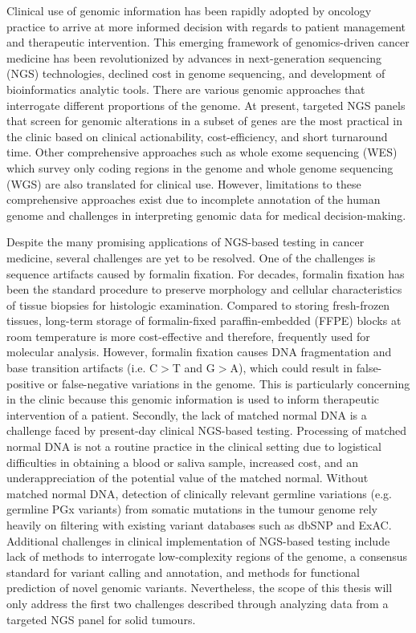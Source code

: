 Clinical use of genomic information has been rapidly adopted by oncology practice to arrive at more informed decision with regards to patient management and therapeutic intervention. This emerging framework of genomics-driven cancer medicine has been revolutionized by advances in next-generation sequencing (NGS) technologies, declined cost in genome sequencing, and development of bioinformatics analytic tools. There are various genomic approaches that interrogate different proportions of the genome. At present, targeted NGS panels that screen for genomic alterations in a subset of genes are the most practical in the clinic based on clinical actionability, cost-efficiency, and short turnaround time. Other comprehensive approaches such as whole exome sequencing (WES) which survey only coding regions in the genome and whole genome sequencing (WGS) are also translated for clinical use. However, limitations to these comprehensive approaches exist due to incomplete annotation of the human genome and challenges in interpreting genomic data for medical decision-making.

Despite the many promising applications of NGS-based testing in cancer medicine, several challenges are yet to be resolved. One of the challenges is sequence artifacts caused by formalin fixation. For decades, formalin fixation has been the standard procedure to preserve morphology and cellular characteristics of tissue biopsies for histologic examination. Compared to storing fresh-frozen tissues, long-term storage of formalin-fixed paraffin-embedded (FFPE) blocks at room temperature is more cost-effective and therefore, frequently used for molecular analysis. However, formalin fixation causes DNA fragmentation and base transition artifacts (i.e. C$>$T and G$>$A), which could result in false-positive or false-negative variations in the genome. This is particularly concerning in the clinic because this genomic information is used to inform therapeutic intervention of a patient. Secondly, the lack of matched normal DNA is a challenge faced by present-day clinical NGS-based testing. Processing of matched normal DNA is not a routine practice in the clinical setting due to logistical difficulties in obtaining a blood or saliva sample, increased cost, and an underappreciation of the potential value of the matched normal. Without matched normal DNA, detection of clinically relevant germline variations (e.g. germline PGx variants) from somatic mutations in the tumour genome rely heavily on filtering with existing variant databases such as dbSNP and ExAC. Additional challenges in clinical implementation of NGS-based testing include lack of methods to interrogate low-complexity regions of the genome, a consensus standard for variant calling and annotation, and methods for functional prediction of novel genomic variants. Nevertheless, the scope of this thesis will only address the first two challenges described through analyzing data from a targeted NGS panel for solid tumours.

